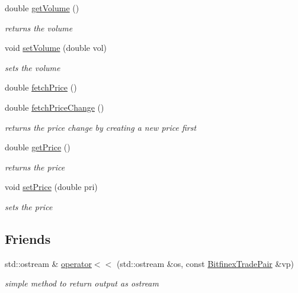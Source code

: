 \begin{DoxyCompactItemize}
double \mbox{\hyperlink{class_bitfinex_trade_pair_aa0e8da551d808f9d64be6f322120777e}{get\+Volume}} ()
\begin{DoxyCompactList}\small\item\em returns the volume \end{DoxyCompactList}\item 
void \mbox{\hyperlink{class_bitfinex_trade_pair_a0fd67bf84f3221538bbceb434a603f34}{set\+Volume}} (double vol)
\begin{DoxyCompactList}\small\item\em sets the volume \end{DoxyCompactList}\item 
double \mbox{\hyperlink{class_bitfinex_trade_pair_a6ae365c882e5950c87fbfba9058b24ac}{fetch\+Price}} ()
\item 
double \mbox{\hyperlink{class_bitfinex_trade_pair_ac28554bdf8f8397e8d751c792aebf948}{fetch\+Price\+Change}} ()
\begin{DoxyCompactList}\small\item\em returns the price change by creating a new price first \end{DoxyCompactList}\item 
double \mbox{\hyperlink{class_bitfinex_trade_pair_a4dc226e8c0dcadbb0ea39381428721a6}{get\+Price}} ()
\begin{DoxyCompactList}\small\item\em returns the price \end{DoxyCompactList}\item 
void \mbox{\hyperlink{class_bitfinex_trade_pair_ada35f305bafd57ad58cabf20241bec7f}{set\+Price}} (double pri)
\begin{DoxyCompactList}\small\item\em sets the price \end{DoxyCompactList}\end{DoxyCompactItemize}
\subsection*{Friends}
\begin{DoxyCompactItemize}
\item 
\mbox{\label{class_bitfinex_trade_pair_aad9f3bb5f4015f3e9b87556ad33f46d7}} 
std\+::ostream \& \mbox{\hyperlink{class_bitfinex_trade_pair_aad9f3bb5f4015f3e9b87556ad33f46d7}{operator$<$$<$}} (std\+::ostream \&os, const \mbox{\hyperlink{class_bitfinex_trade_pair}{Bitfinex\+Trade\+Pair}} \&vp)
\begin{DoxyCompactList}\small\item\em simple method to return output as ostream \end{DoxyCompactList}\end{DoxyCompactItemize}


